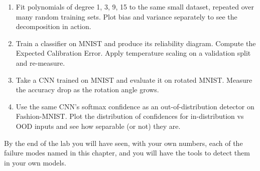 \begin{enumerate}
  \item Fit polynomials of degree 1, 3, 9, 15 to the same small dataset, repeated over many random training sets. Plot bias and variance separately to see the decomposition in action.
  \item Train a classifier on MNIST and produce its reliability diagram. Compute the Expected Calibration Error. Apply temperature scaling on a validation split and re-measure.
  \item Take a CNN trained on MNIST and evaluate it on rotated MNIST. Measure the accuracy drop as the rotation angle grows.
  \item Use the same CNN's softmax confidence as an out-of-distribution detector on Fashion-MNIST. Plot the distribution of confidences for in-distribution vs OOD inputs and see how separable (or not) they are.
\end{enumerate}

By the end of the lab you will have seen, with your own numbers, each of the failure modes named in this chapter, and you will have the tools to detect them in your own models.
